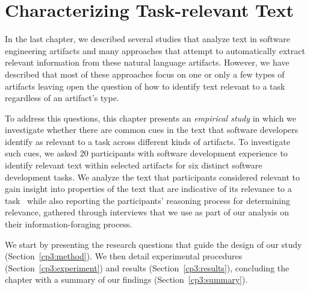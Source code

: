 \setcounter{chapter}{2}


\chapter{Characterizing Task-relevant Text}
\label{ch:characterizing}



In the last chapter,
we described several studies that analyze text in software engineering artifacts
and many approaches that attempt to automatically extract relevant information from
these natural language artifacts. However, 
we have described that
most of these approaches focus on 
one or only a 
few types of artifacts
leaving open the question of 
how to identify text relevant to a task regardless of an artifact's type.






To address this questions, 
this chapter presents an
\textit{empirical study} in which we
investigate whether 
there are common cues in the text
that software developers identify as relevant to a task across
different kinds of artifacts.
To investigate such cues, we 
asked 20 participants with
software development experience to identify relevant text within
selected artifacts for six distinct software development tasks.
We analyze the text that participants considered relevant 
to gain insight into properties of the text 
that are indicative of its relevance to a task~\cite{das2014frame, jurafsky2014speech}
while also reporting the participants'
reasoning process for determining relevance,
 gathered through interviews
that we use as part of our analysis on
their information-foraging process.



We start by presenting the research questions that guide 
the design of our study (Section~\ref{cp3:method}).
We then detail experimental procedures (Section~\ref{cp3:experiment}) 
and results (Section~\ref{cp3:results}),
concluding the chapter with a summary of our findings (Section~\ref{cp3:summary}).












